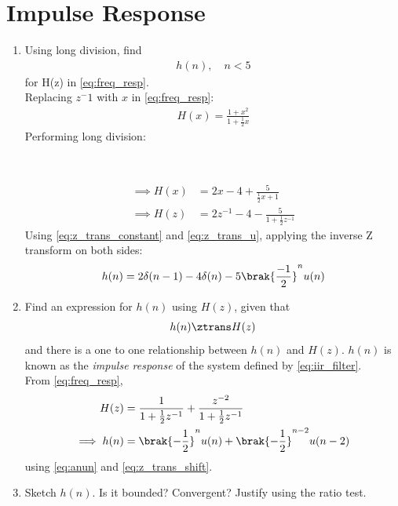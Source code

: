 \documentclass[journal,12pt,twocolumn]{IEEEtran}
\renewcommand\thesection{\arabic{section}}
\begin{document}
\section{Impulse Response}
\begin{enumerate}[label=\thesection.\arabic*]
\item Using long division, find
\begin{align}
	h(n), \quad n < 5
\end{align}
for H(z) in \eqref{eq:freq_resp}.\\
\solution Replacing $z^-1$ with $x$ in  \eqref{eq:freq_resp}:
\begin{align}
    H(x) = \frac{1+x^2}{1+\frac{1}{2}x}
\end{align}
Performing long division:\\
\begin{center}
    \\
\end{center}
\begin{align}
    \implies H(x) &= 2x-4 + \frac{5}{\frac{1}{2}x+1}\\
    \implies H(z) &= 2z^{-1}-4-\frac{5}{1+\frac{1}{2}z^{-1}}
\end{align}
Using \eqref{eq:z_trans_constant} and \eqref{eq:z_trans_u}, applying the inverse Z transform on both sides:
\begin{align}
    h(n) = 2\delta(n-1)-4\delta(n)-5\brak{\frac{-1}{2}}^nu(n)
\end{align}
\item \label{prob:impulse_resp}
Find an expression for $h(n)$ using $H(z)$, given that 
\begin{equation}
\label{eq:impulse_resp}
h(n) \ztrans H(z)
\end{equation}
and there is a one to one relationship between $h(n)$ and $H(z)$. $h(n)$ is known as the {\em impulse response} of the
system defined by \eqref{eq:iir_filter}.
\\
\solution From \eqref{eq:freq_resp},
\begin{align}
H(z) &= \frac{1}{1 + \frac{1}{2}z^{-1}} + \frac{ z^{-2}}{1 + \frac{1}{2}z^{-1}}
\\
\implies h(n) &= \brak{-\frac{1}{2}}^{n}u(n) + \brak{-\frac{1}{2}}^{n-2}u(n-2) \label{eq:hn}
\end{align}
using \eqref{eq:anun} and \eqref{eq:z_trans_shift}.
\item Sketch $h(n)$. Is it bounded? Convergent? Justify using the ratio test.

\end{enumerate}
\end{document}
